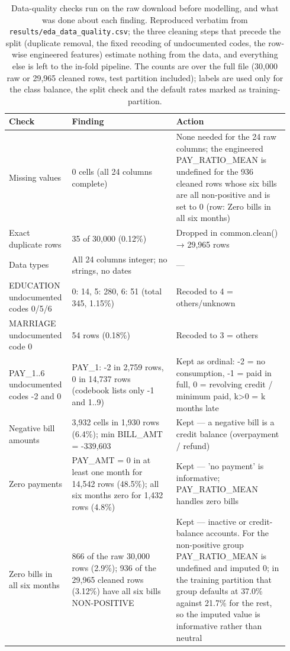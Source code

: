 \begin{table}[!htbp]
  \caption{Data-quality checks run on the raw download before modelling, and what was done about each finding. Reproduced verbatim from \texttt{results/eda\_data\_quality.csv}; the three cleaning steps that precede the split (duplicate removal, the fixed recoding of undocumented codes, the row-wise engineered features) estimate nothing from the data, and everything else is left to the in-fold pipeline. The counts are over the full file (30,000 raw or 29,965 cleaned rows, test partition included); labels are used only for the class balance, the split check and the default rates marked as training-partition.}
  \label{tab:a-quality}
  \centering
  \footnotesize
  \setlength{\tabcolsep}{3pt}
  \begin{tabular}{@{}L{0.19\linewidth}L{0.36\linewidth}L{0.39\linewidth}@{}}
    \toprule
    Check & Finding & Action \\
    \midrule
    Missing values & 0 cells (all 24 columns complete) & None needed for the 24 raw columns; the engineered PAY\_RATIO\_MEAN is undefined for the 936 cleaned rows whose six bills are all non-positive and is set to 0 (row: Zero bills in all six months) \\
    Exact duplicate rows & 35 of 30,000 (0.12\%) & Dropped in common.clean() → 29,965 rows \\
    Data types & All 24 columns integer; no strings, no dates & --- \\
    EDUCATION undocumented codes 0/5/6 & 0: 14, 5: 280, 6: 51 (total 345, 1.15\%) & Recoded to 4 = others/unknown \\
    MARRIAGE undocumented code 0 & 54 rows (0.18\%) & Recoded to 3 = others \\
    PAY\_1..6 undocumented codes -2 and 0 & PAY\_1: -2 in 2,759 rows, 0 in 14,737 rows (codebook lists only -1 and 1..9) & Kept as ordinal: -2 = no consumption, -1 = paid in full, 0 = revolving credit / minimum paid, k>0 = k months late \\
    Negative bill amounts & 3,932 cells in 1,930 rows (6.4\%); min BILL\_AMT = -339,603 & Kept — a negative bill is a credit balance (overpayment / refund) \\
    Zero payments & PAY\_AMT = 0 in at least one month for 14,542 rows (48.5\%); all six months zero for 1,432 rows (4.8\%) & Kept — 'no payment' is informative; PAY\_RATIO\_MEAN handles zero bills \\
    Zero bills in all six months & 866 of the raw 30,000 rows (2.9\%); 936 of the 29,965 cleaned rows (3.12\%) have all six bills NON-POSITIVE & Kept — inactive or credit-balance accounts. For the non-positive group PAY\_RATIO\_MEAN is undefined and imputed 0; in the training partition that group defaults at 37.0\% against 21.7\% for the rest, so the imputed value is informative rather than neutral \\

\end{tabular}
\end{table}
